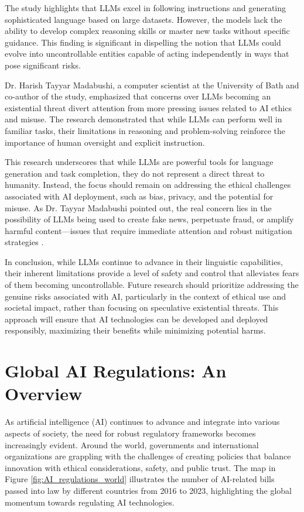 The study highlights that LLMs excel in following instructions and generating sophisticated language based on large datasets. However, the models lack the ability to develop complex reasoning skills or master new tasks without specific guidance. This finding is significant in dispelling the notion that LLMs could evolve into uncontrollable entities capable of acting independently in ways that pose significant risks.

Dr. Harish Tayyar Madabushi, a computer scientist at the University of Bath and co-author of the study, emphasized that concerns over LLMs becoming an existential threat divert attention from more pressing issues related to AI ethics and misuse. The research demonstrated that while LLMs can perform well in familiar tasks, their limitations in reasoning and problem-solving reinforce the importance of human oversight and explicit instruction.

This research underscores that while LLMs are powerful tools for language generation and task completion, they do not represent a direct threat to humanity. Instead, the focus should remain on addressing the ethical challenges associated with AI deployment, such as bias, privacy, and the potential for misuse. As Dr. Tayyar Madabushi pointed out, the real concern lies in the possibility of LLMs being used to create fake news, perpetuate fraud, or amplify harmful content—issues that require immediate attention and robust mitigation strategies \cite{lu2023emergent}.

In conclusion, while LLMs continue to advance in their linguistic capabilities, their inherent limitations provide a level of safety and control that alleviates fears of them becoming uncontrollable. Future research should prioritize addressing the genuine risks associated with AI, particularly in the context of ethical use and societal impact, rather than focusing on speculative existential threats. This approach will ensure that AI technologies can be developed and deployed responsibly, maximizing their benefits while minimizing potential harms.

\section{Global AI Regulations: An Overview}

As artificial intelligence (AI) continues to advance and integrate into various aspects of society, the need for robust regulatory frameworks becomes increasingly evident. Around the world, governments and international organizations are grappling with the challenges of creating policies that balance innovation with ethical considerations, safety, and public trust. The map in Figure \ref{fig:AI_regulations_world} illustrates the number of AI-related bills passed into law by different countries from 2016 to 2023, highlighting the global momentum towards regulating AI technologies.

